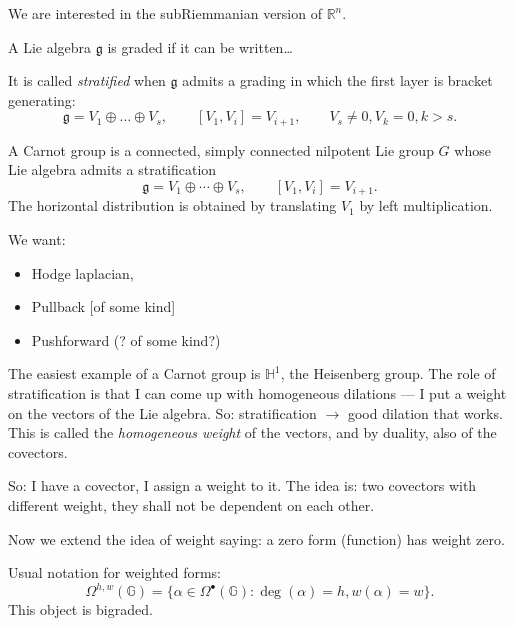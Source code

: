 \begin{definition}
\label{definition-admissible-curve}

\end{definition}

\noindent
We are interested in the subRiemmanian
version of $\mathbb{R}^n$.

\begin{definition}
\label{definition-graded-lie-algebra}
A Lie algebra $\mathfrak{g}$ is graded
if it can be written…

It is called {\it stratified} when $\mathfrak{g}$
admits a grading in which the first layer is
bracket generating:
$$
\mathfrak{g}=V_1 \oplus … \oplus V_s
, \qquad 
[V_1,V_i]=V_{i+1},
\qquad V_s \neq 0, V_k =0, k>s.
$$
\end{definition}

\begin{definition}
\label{definition-carnot-group}
A Carnot group is a connected, simply
connected nilpotent Lie group $G$ whose
Lie algebra admits a stratification
\[
\mathfrak g=V_1\oplus\cdots\oplus V_s,
\qquad [V_1,V_i]=V_{i+1}.
\]
The horizontal distribution is obtained
by translating $V_1$ by left multiplication.
\end{definition}

\noindent
We want:
\begin{itemize}
\item Hodge laplacian,
\item Pullback [of some kind]
\item Pushforward (? of some kind?)
\end{itemize}

\noindent
The easiest example of a Carnot group
is $\mathbb{H}^1$, the Heisenberg group.
The role of stratification is that I can
come up with homogeneous dilations --- 
I put a weight on the vectors of the Lie
algebra. So: stratification $\to$ good
dilation that works. This is called
the {\it homogeneous weight} of the vectors,
and by duality, also of the covectors.

So: I have a covector, I assign a weight to
it. The idea is: two covectors with
different weight, they shall not be
dependent on each other.

Now we extend the idea of weight saying:
a zero form (function) has weight zero.

Usual notation for weighted forms:
 $$
\Omega^{h,w}(\mathbb{G})
=\{\alpha \in \Omega^\bullet(\mathbb{G}):
\operatorname{deg}(\alpha)=h,
w(\alpha)=w\}.
$$
This object is bigraded.

